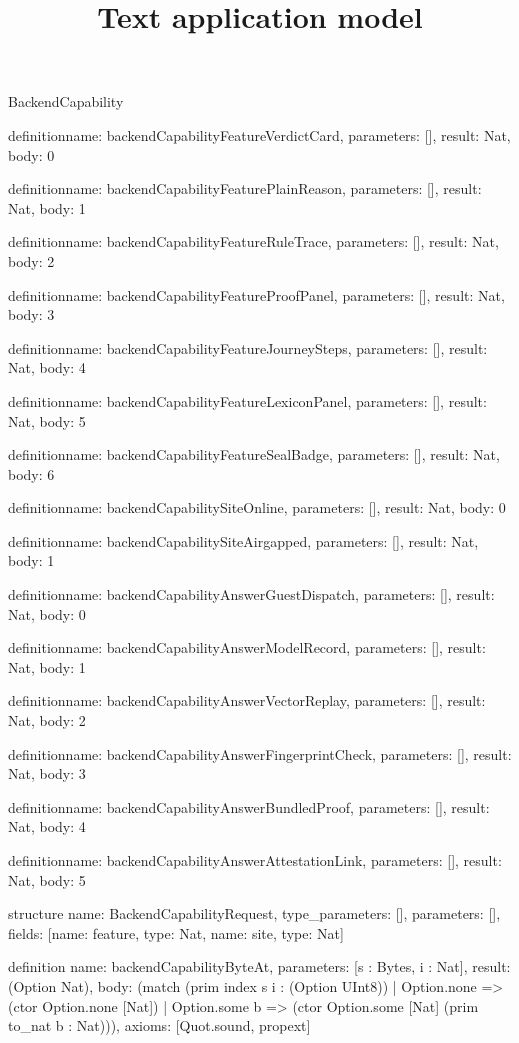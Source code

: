 \begin{lexlean}{BackendCapability}
\title{Text application model}
\begin{semanticmodule}
definition{name: backendCapabilityFeatureVerdictCard, parameters: [], result: Nat, body: 0}

definition{name: backendCapabilityFeaturePlainReason, parameters: [], result: Nat, body: 1}

definition{name: backendCapabilityFeatureRuleTrace, parameters: [], result: Nat, body: 2}

definition{name: backendCapabilityFeatureProofPanel, parameters: [], result: Nat, body: 3}

definition{name: backendCapabilityFeatureJourneySteps, parameters: [], result: Nat, body: 4}

definition{name: backendCapabilityFeatureLexiconPanel, parameters: [], result: Nat, body: 5}

definition{name: backendCapabilityFeatureSealBadge, parameters: [], result: Nat, body: 6}

definition{name: backendCapabilitySiteOnline, parameters: [], result: Nat, body: 0}

definition{name: backendCapabilitySiteAirgapped, parameters: [], result: Nat, body: 1}

definition{name: backendCapabilityAnswerGuestDispatch, parameters: [], result: Nat, body: 0}

definition{name: backendCapabilityAnswerModelRecord, parameters: [], result: Nat, body: 1}

definition{name: backendCapabilityAnswerVectorReplay, parameters: [], result: Nat, body: 2}

definition{name: backendCapabilityAnswerFingerprintCheck, parameters: [], result: Nat, body: 3}

definition{name: backendCapabilityAnswerBundledProof, parameters: [], result: Nat, body: 4}

definition{name: backendCapabilityAnswerAttestationLink, parameters: [], result: Nat, body: 5}

structure{
  name: BackendCapabilityRequest,
  type_parameters: [],
  parameters: [],
  fields: [{name: feature, type: Nat}, {name: site, type: Nat}]
}

definition{
  name: backendCapabilityByteAt,
  parameters: [s : Bytes, i : Nat],
  result: (Option Nat),
  body: (match (prim index s i : (Option UInt8))
    | Option.none => (ctor Option.none [Nat])
    | Option.some b => (ctor Option.some [Nat] (prim to_nat b : Nat))),
  axioms: [Quot.sound, propext]
}


\end{semanticmodule}
\end{lexlean}
